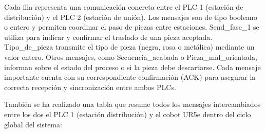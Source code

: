 Cada fila representa una comunicación concreta entre el PLC 1 (estación de distribución) y el PLC 2 (estación de unión). Los mensajes son de tipo booleano o entero y permiten coordinar el paso de piezas entre estaciones. Send\_fase\_1 se utiliza para indicar y confirmar el traslado de una pieza aceptada. Tipo\_de\_pieza transmite el tipo de pieza (negra, rosa o metálica) mediante un valor entero. Otros mensajes, como Secuencia\_acabada o Pieza\_mal\_orientada, informan sobre el estado del proceso o si la pieza debe descartarse. Cada mensaje importante cuenta con su correspondiente confirmación (ACK) para asegurar la correcta recepción y sincronización entre ambos PLCs.

\newpage

También se ha realizado una tabla que resume todos los mensajes intercambiados entre los dos el PLC 1 (estación distribución) y el cobot UR5e dentro del ciclo global del sistema: 


